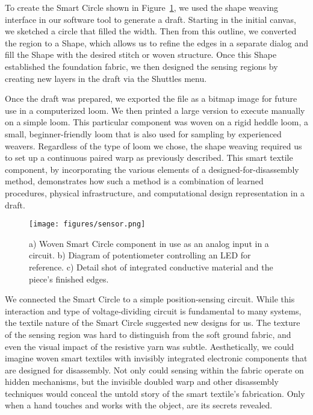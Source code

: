 \documentclass{sigchi}
\begin{document}
To create the Smart Circle shown in Figure~\ref{fig:smartCircle}, we used the shape weaving interface in our software tool to generate a draft. Starting in the initial canvas, we sketched a circle that filled the width. Then from this outline, we converted the region to a Shape, which allows us to refine the edges in a separate dialog and fill the Shape with the desired stitch or woven structure. Once this Shape established the foundation fabric, we then designed the sensing regions by creating new layers in the draft via the Shuttles menu. 

Once the draft was prepared, we exported the file as a bitmap image for future use in a computerized loom. We then printed a large version to execute manually on a simple loom. This particular component was woven on a rigid heddle loom, a small, beginner-friendly loom that is also used for sampling by experienced weavers. Regardless of the type of loom we chose, the shape weaving required us to set up a continuous paired warp as previously described. This smart textile component, by incorporating the various elements of a designed-for-disassembly method, demonstrates how such a method is a combination of learned procedures, physical infrastructure, and computational design representation in a draft. 

\begin{figure}[t!]
    \centering
    \texttt{[image: figures/sensor.png]}
    \caption{a) Woven Smart Circle component in use as an analog input in a circuit. b) Diagram of potentiometer controlling an LED for reference. c) Detail shot of integrated conductive material and the piece's finished edges.}
    \label{fig:smartCircle}
    \vspace{-1.5em}
\end{figure}

We connected the Smart Circle to a simple position-sensing circuit. While this interaction and type of voltage-dividing circuit is fundamental to many systems, the textile nature of the Smart Circle suggested new designs for us. The texture of the sensing region was hard to distinguish from the soft ground fabric, and even the visual impact of the resistive yarn was subtle. Aesthetically, we could imagine woven smart textiles with invisibly integrated electronic components that are designed for disassembly. Not only could sensing within the fabric operate on hidden mechanisms, but the invisible doubled warp and other disassembly techniques would conceal the untold story of the smart textile's fabrication. Only when a hand touches and works with the object, are its secrets revealed.
\end{document}
